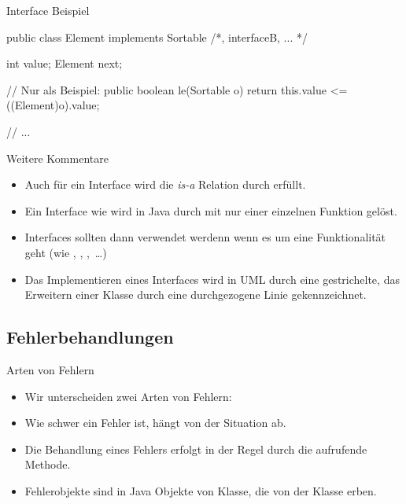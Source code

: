 \begin{frame}[fragile,c]{Interface Beispiel}
\begin{plainjava}
public class Element implements Sortable /*, interfaceB, ... */ {
    int value;
    Element next;

    // Nur als Beispiel:
    public boolean le(Sortable o) {
        return this.value <= ((Element)o).value;
    }

    // ...
}
\end{plainjava}
\end{frame}

\begin{frame}{Weitere Kommentare}
    \begin{itemize}[<+(1)->]
        \widei
        \item Auch für ein Interface wird die \emph{is-a} Relation durch  erfüllt.
        \item Ein Interface wie  wird in Java durch  mit nur einer einzelnen Funktion  gelöst.
        \item Interfaces sollten dann verwendet werdenn wenn es um eine Funktionalität geht (wie , , ,~\ldots)
        \item Das Implementieren eines Interfaces wird in UML durch eine gestrichelte, das Erweitern einer Klasse durch eine durchgezogene  Linie gekennzeichnet.%
    \end{itemize}
\end{frame}

\subsection{Fehlerbehandlungen}
\begin{frame}{Arten von Fehlern}
    \begin{itemize}[<+(1)->]
        \widei
        \item Wir unterscheiden zwei Arten von Fehlern: 
        \item Wie schwer ein Fehler ist, hängt von der Situation ab.
        \item Die Behandlung eines Fehlers erfolgt in der Regel durch die aufrufende Methode.
        \item Fehlerobjekte sind in Java Objekte von Klasse,\pause{} die von der  Klasse erben.
    \end{itemize}
\end{frame}

